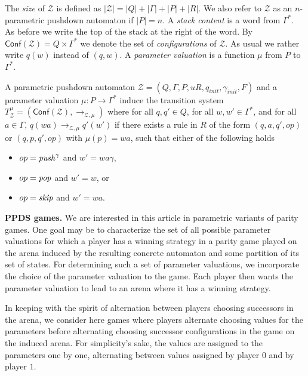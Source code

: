 \documentclass[a4paper,UKenglish,cleveref, autoref, thm-restate]{lipics-v2021}
\newcommand{\Conf}{\mathsf{Conf}}
\begin{document}
The {\em size} of $\mathcal{Z}$ is defined as
$|\mathcal{Z}| = |Q| + |\Gamma| + |P| + |R| $.
We also refer to $\mathcal{Z}$ as an $n$-parametric pushdown automaton if $|P| = n$.
A {\em stack content} is a word from $ \Gamma^*$. 
As before we write the top
of the stack at the right of the word. 
By $\Conf(\mathcal{Z})=Q\times  \Gamma^*$ we denote the set of
{\em configurations} of $\mathcal{Z}$. As usual we rather write $q(w)$ instead of $(q, w)$.
A {\em parameter valuation} is a function $\mu$ from $P$ to $\Gamma^*$.

\begin{samepage}
A parametric pushdown automaton  $\mathcal{Z}= (Q, \Gamma, P,u R, q_{init}, \gamma_{init},F)$ 
and a parameter valuation $\mu: P\rightarrow \Gamma^*$ induce the 
transition system  
$T_{\mathcal{Z}}^{\mu} = (\Conf(\mathcal{Z}), 
\rightarrow_{\mathcal{Z},\mu})$ where
for all $ q, q'  \in  Q$, 
for all $ w,w' \in \Gamma^* $, and 
for all $ a  \in  \Gamma$, 
$q(wa) \rightarrow_{\mathcal{Z},\mu} q'(w')$
if there exists a rule in $R$
 of the form $(q,a,q', op)$ or $(q,p,q', op)$ with $\mu(p)=wa$,
such that
either of the following holds
\begin{itemize}
\item $ op = \text{\textit{push}}^\gamma$ and $w' = wa\gamma$,

\item $ op = \text{\textit{pop}}$ and $w' = w$, or

\item $ op = \text{\textit{skip}}$ and $w' = wa$.
\end{itemize}
\end{samepage}








\textbf{PPDS games.}
We are interested in this article in parametric variants of parity games.
One goal may be to characterize the set of all possible parameter valuations for which a player has a winning strategy in a parity game
played on the arena induced by the
resulting concrete automaton
and some partition of its set of states. 
For determining such a set of parameter valuations, we incorporate the choice of the parameter valuation to the game. Each player then wants the parameter valuation to lead to an arena where it has a winning strategy.

In keeping with the spirit of alternation between players choosing successors in the arena, we consider here games where players
alternate choosing values for the parameters before alternating choosing successor configurations in the game on the induced arena.
For simplicity's sake, the values are assigned to the parameters one by one, alternating between values assigned by player $0$ and by player $1$.
\end{document}
